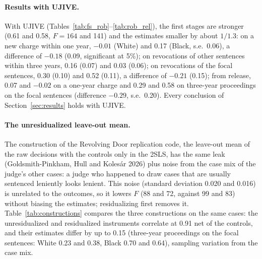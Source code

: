 \documentclass[11pt]{article}
\begin{document}
\paragraph{Results with UJIVE.} With UJIVE (Tables~\ref{tab:fs_rob}--\ref{tab:rob_rel}), the first stages are stronger (0.61 and 0.58, $F = 164$ and 141) and the estimates smaller by about $1/1.3$: on a new charge within one year, $-0.01$ (White) and 0.17 (Black, s.e.\ 0.06), a difference of $-0.18$ (0.09, significant at 5\%); on revocations of other sentences within three years, 0.16 (0.07) and 0.03 (0.06); on revocations of the focal sentences, 0.30 (0.10) and 0.52 (0.11), a difference of $-0.21$ (0.15); from release, 0.07 and $-0.02$ on a one-year charge and 0.29 and 0.58 on three-year proceedings on the focal sentences (difference $-0.29$, s.e.\ 0.20). Every conclusion of Section~\ref{sec:results} holds with UJIVE.

\paragraph{The unresidualized leave-out mean.} The construction of the Revolving Door replication code, the leave-out mean of the raw decisions with the controls only in the 2SLS, has the same leak (Goldsmith-Pinkham, Hull and Kolesár 2026) plus noise from the case mix of the judge's other cases: a judge who happened to draw cases that are usually sentenced leniently looks lenient. This noise (standard deviation 0.020 and 0.016) is unrelated to the outcomes, so it lowers $F$ (88 and 72, against 99 and 83) without biasing the estimates; residualizing first removes it. Table~\ref{tab:constructions} compares the three constructions on the same cases: the unresidualized and residualized instruments correlate at 0.91 net of the controls, and their estimates differ by up to 0.15 (three-year proceedings on the focal sentences: White 0.23 and 0.38, Black 0.70 and 0.64), sampling variation from the case mix.
\end{document}
